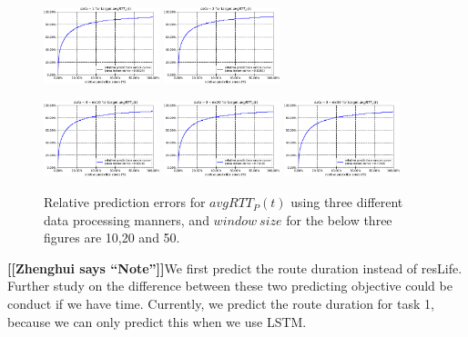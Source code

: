 \documentclass[sigconf]{acmart}
\newcommand{\hui}[1]{{\bf \color{purple} [[Zhenghui says ``#1'']]}}
\begin{document}
	\begin{figure} [!htb] 
		\centering  
		\includegraphics[width=0.3\textwidth]{fig4/data-1-task-3-7030-RF.pdf}  
		\includegraphics[width=0.3\textwidth]{fig4/data-2-task-3-7030-RF.pdf} 
	\end{figure} 
	\begin{figure} 	
		\includegraphics[width=0.3\textwidth]{fig4/data-3-task-3-7030-windowsize10-RF.pdf} 
		\includegraphics[width=0.3\textwidth]{fig4/data-3-task-3-7030-windowsize20-RF.pdf}
		\includegraphics[width=0.3\textwidth]{fig4/data-3-task-3-7030-windowsize50-RF.pdf}
		\caption{Relative prediction errors for $avgRTT_P(t)$ using three different data processing manners, and $window\ size$ for the below three figures are 10,20 and 50.}
		\label{fig:task3_RF}
	\end{figure}
	
	\hui{Note}We first predict the route duration instead of resLife. Further study on the difference between these two predicting objective could be conduct if we have time. Currently, we predict the route duration for task 1, because we can only predict this when we use LSTM.
	
\end{document}
